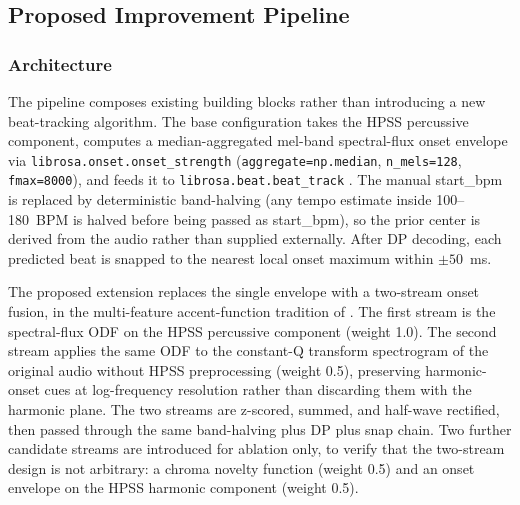 \documentclass{article}
\begin{document}
\subsection{Proposed Improvement Pipeline}

\subsubsection{Architecture}
The pipeline composes existing building blocks rather than introducing a new beat-tracking algorithm. The base configuration takes the HPSS \cite{fitzgerald2010hpss} percussive component, computes a median-aggregated mel-band spectral-flux onset envelope \cite{bello2005onset} via \texttt{librosa.onset.onset\_strength} (\texttt{aggregate=np.median}, \texttt{n\_mels=128}, \texttt{fmax=8000}), and feeds it to \texttt{librosa.beat.beat\_track} \cite{ellis2007beat}. The manual start\_bpm is replaced by deterministic band-halving (any tempo estimate inside 100--180~BPM is halved before being passed as start\_bpm), so the prior center is derived from the audio rather than supplied externally. After DP decoding, each predicted beat is snapped to the nearest local onset maximum within $\pm 50$~ms.

The proposed extension replaces the single envelope with a two-stream onset fusion, in the multi-feature accent-function tradition of \cite{goto2001beat,klapuri2006meter}. The first stream is the spectral-flux ODF \cite{bello2005onset} on the HPSS percussive component (weight 1.0). The second stream applies the same ODF to the constant-Q transform spectrogram \cite{schorkhuber2010cqt} of the original audio without HPSS preprocessing (weight 0.5), preserving harmonic-onset cues at log-frequency resolution rather than discarding them with the harmonic plane. The two streams are z-scored, summed, and half-wave rectified, then passed through the same band-halving plus DP plus snap chain. Two further candidate streams are introduced for ablation only, to verify that the two-stream design is not arbitrary: a chroma novelty function (weight 0.5) and an onset envelope on the HPSS harmonic component (weight 0.5).
\end{document}
